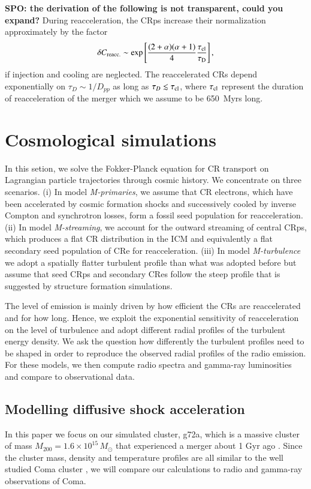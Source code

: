 \documentclass[fleqn,usenatbib,useAMS]{mnras}
\def\SPO#1{{\bf {\color{red} SPO: #1}}}
\begin{document}
\SPO{the derivation of the following is not transparent, could you expand?}
During reacceleration, the CRps increase their normalization
approximately by the factor
\begin{equation}
  \label{eq:Creacc}
  \delta C_{\mathrm{reacc.}} \sim 
  \exp{\left[\frac{(2+\alpha)(\alpha+1)}{4}\frac{\tau_{\mathrm{cl}}}{\tau_{\mathrm{D}}}\right]}\,,
\end{equation}
if injection and cooling are neglected. The reaccelerated CRs depend
exponentially on $\tau_D\sim 1/D_{pp}$ as long as $\tau_D \lesssim
\tau_{\mathrm{cl}}$, where $\tau_{\mathrm{cl}}$ represent the duration of
reacceleration of the merger which we assume to be 650~Myrs long.



\section{Cosmological simulations}
\label{sec:results}

In this setion, we solve the Fokker-Planck equation for CR transport
on Lagrangian particle trajectories through cosmic history.  We
concentrate on three scenarios. (i) In model {\em M-primaries}, we
assume that CR electrons, which have been accelerated by cosmic
formation shocks and successively cooled by inverse Compton and
synchrotron losses, form a fossil seed population for
reacceleration. (ii) In model {\em M-streaming}, we account for the
outward streaming of central CRps, which produces a flat CR
distribution in the ICM and equivalently a flat secondary seed
population of CRe for reacceleration. (iii) In model {\em
  M-turbulence} we adopt a spatially flatter turbulent profile than
what was adopted before but assume that seed CRps and secondary CRes
follow the steep profile that is suggested by structure formation
simulations.

The level of emission is mainly driven by how efficient the CRs are
reaccelerated and for how long. Hence, we exploit the exponential
sensitivity of reacceleration on the level of turbulence and adopt
different radial profiles of the turbulent energy density. We ask the
question how differently the turbulent profiles need to be shaped in
order to reproduce the observed radial profiles of the radio
emission. For these models, we then compute radio spectra and
gamma-ray luminosities and compare to observational data.


\subsection{Modelling diffusive shock acceleration}
\label{sec:cosmo_sim}
In this paper we focus on our simulated cluster, g72a, which is a
massive cluster of mass $M_{200}=1.6\times10^{15}\,M_\odot$ that
experienced a merger about 1 Gyr ago
\citep{2009MNRAS.399..497D}. Since the cluster mass, density and
temperature profiles are all similar to the well studied Coma cluster
\citep{2007MNRAS.378..385P,pinzke10}, we will compare our calculations
to radio and gamma-ray observations of Coma.
\end{document}
